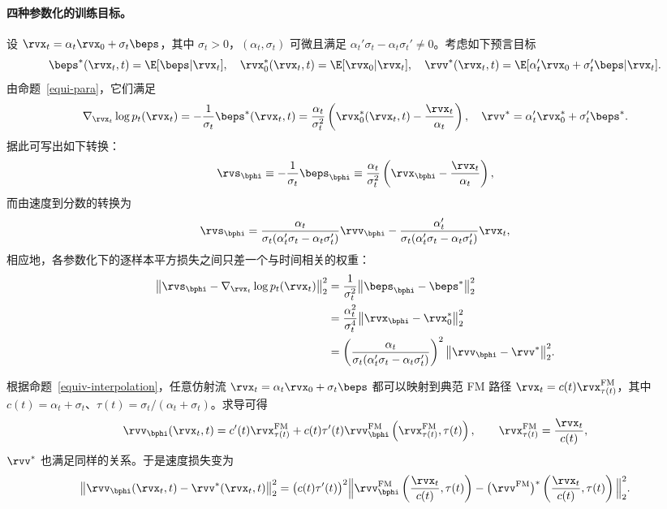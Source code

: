 \paragraph{四种参数化的训练目标。}
设 $\rvx_t=\alpha_t \rvx_0+\sigma_t \beps$，其中 $\sigma_t>0$，$(\alpha_t,\sigma_t)$ 可微且满足 $\alpha_t'\sigma_t-\alpha_t\sigma_t'\neq 0$。考虑如下预言目标
\[
\beps^*(\rvx_t,t)=\E[\beps|\rvx_t],\quad
\rvx_0^*(\rvx_t,t)=\E[\rvx_0|\rvx_t],\quad
\rvv^*(\rvx_t,t)=\E[\alpha_t'\rvx_0+\sigma_t'\beps|\rvx_t].
\]
由命题~\ref{equi-para}，它们满足
\[
\nabla_{\rvx_t}\log p_t(\rvx_t)
= -\frac{1}{\sigma_t} \beps^*(\rvx_t,t)
= \frac{\alpha_t}{\sigma_t^2} \left(\rvx_0^*(\rvx_t,t)-\frac{\rvx_t}{\alpha_t}\right),
\quad
\rvv^*=\alpha_t' \rvx_0^*+\sigma_t' \beps^*.
\]
据此可写出如下转换：
\[
\rvs_{\bphi} \equiv -\frac{1}{\sigma_t} \beps_{\bphi}
\equiv \frac{\alpha_t}{\sigma_t^2} \left(\rvx_{\bphi}-\frac{\rvx_t}{\alpha_t}\right),
\]
而由速度到分数的转换为
\[
\rvs_{\bphi}
= \frac{\alpha_t}{\sigma_t(\alpha_t'\sigma_t-\alpha_t\sigma_t')} \rvv_{\bphi}
- \frac{\alpha_t'}{\sigma_t(\alpha_t'\sigma_t-\alpha_t\sigma_t')} \rvx_t,
\]
相应地，各参数化下的逐样本平方损失之间只差一个与时间相关的权重：
\begin{align}\label{eq:s-e-x-v-equi}
\begin{aligned}
\big\|\rvs_{\bphi}-\nabla_{\rvx_t}\log p_t(\rvx_t)\big\|_2^2
&=\frac{1}{\sigma_t^2} \big\|\beps_{\bphi}-\beps^*\big\|_2^2 \\
&=\frac{\alpha_t^2}{\sigma_t^4} \big\|\rvx_{\bphi}-\rvx_0^*\big\|_2^2 \\
&=\left(\frac{\alpha_t}{\sigma_t(\alpha_t'\sigma_t-\alpha_t\sigma_t')}\right)^{ 2}
\big\|\rvv_{\bphi}-\rvv^*\big\|_2^2 .
\end{aligned}
\end{align}

根据命题~\ref{equiv-interpolation}，任意仿射流 $\rvx_t=\alpha_t\rvx_0+\sigma_t\beps$
都可以映射到典范 FM 路径 $\rvx_t=c(t)\rvx^{\mathrm{FM}}_{\tau(t)}$，其中
$c(t)=\alpha_t+\sigma_t$、$\tau(t)=\sigma_t/(\alpha_t+\sigma_t)$。求导可得
\[
\rvv_{\bphi}(\rvx_t,t)=c'(t)\rvx^{\mathrm{FM}}_{\tau(t)}
+c(t)\tau'(t)\rvv^{\mathrm{FM}}_{\bphi} \left(\rvx_{\tau(t)}^{\mathrm{FM}},\tau(t)\right),
\qquad
\rvx_{\tau(t)}^{\mathrm{FM}}=\frac{\rvx_t}{c(t)},
\]
$\rvv^*$ 也满足同样的关系。于是速度损失变为
\begin{align*}
    \big\|\rvv_{\bphi}(\rvx_t,t)-\rvv^*(\rvx_t,t)\big\|_2^2
= \big(c(t) \tau'(t)\big)^2
\Big\|\rvv^{\mathrm{FM}}_{\bphi} \left(\frac{\rvx_t}{c(t)},\tau(t)\right)
-\big(\rvv^{\mathrm{FM}}\big)^* \left(\frac{\rvx_t}{c(t)},\tau(t)\right)\Big\|_2^2.
\end{align*}

